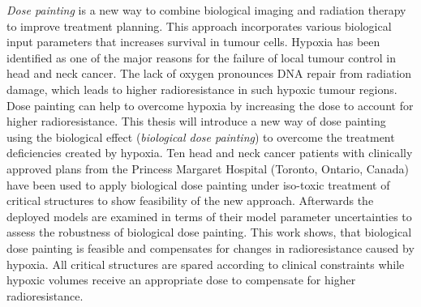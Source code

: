 
\textit{Dose painting} is a new way to combine biological imaging and radiation therapy to improve treatment planning. This approach incorporates various biological input parameters that increases survival in tumour cells.  Hypoxia has been identified as one of the major reasons for the failure of local tumour control in head and neck cancer. The lack of oxygen pronounces DNA repair from radiation damage, which leads to higher radioresistance in such hypoxic tumour regions. Dose painting can help to overcome hypoxia by increasing the dose to account for higher radioresistance. This thesis will introduce a new way of dose painting using the biological effect (\textit{biological dose painting}) to overcome the treatment deficiencies created by hypoxia. Ten head and neck cancer patients with clinically approved plans from the Princess Margaret Hospital (Toronto, Ontario, Canada) have been used to apply biological dose painting under iso-toxic treatment of critical structures to show feasibility of the new approach. Afterwards the deployed models are examined in terms of their model parameter uncertainties to assess the robustness of biological dose painting. This work shows, that biological dose painting is feasible and compensates for changes in radioresistance caused by hypoxia. All critical structures are spared according to clinical constraints while hypoxic volumes receive an appropriate dose to compensate for higher radioresistance.
